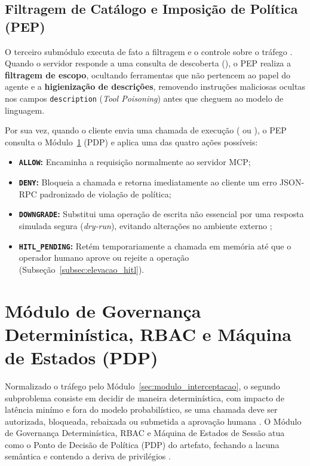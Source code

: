 \subsection{Filtragem de Catálogo e Imposição de Política (PEP)}
\label{subsec:pep_filtragem}

O terceiro submódulo executa de fato a filtragem e o controle sobre o tráfego \cite{singh2026mcpsecure,hasan2026mcp}. Quando o servidor responde a uma consulta de descoberta (), o PEP realiza a \textbf{filtragem de escopo}, ocultando ferramentas que não pertencem ao papel do agente e a \textbf{higienização de descrições}, removendo instruções maliciosas ocultas nos campos \texttt{description} (\textit{Tool Poisoning}) \cite{hasan2026mcp,hou2025mcp} antes que cheguem ao modelo de linguagem.

Por sua vez, quando o cliente envia uma chamada de execução ( ou ), o PEP consulta o Módulo~\ref{sec:modulo_rbac_estados} (PDP) e aplica uma das quatro ações possíveis:
\begin{itemize}
  \item \textbf{\texttt{ALLOW}:} Encaminha a requisição normalmente ao servidor MCP;
  \item \textbf{\texttt{DENY}:} Bloqueia a chamada e retorna imediatamente ao cliente um erro JSON-RPC padronizado de violação de política;
  \item \textbf{\texttt{DOWNGRADE}:} Substitui uma operação de escrita não essencial por uma resposta simulada segura (\textit{dry-run}), evitando alterações no ambiente externo \cite{singh2026mcpsecure};
  \item \textbf{\texttt{HITL\_PENDING}:} Retém temporariamente a chamada em memória até que o operador humano aprove ou rejeite a operação (Subseção~\ref{subsec:elevacao_hitl}).
\end{itemize}

\section{Módulo de Governança Determinística, RBAC e Máquina de Estados (PDP)}
\label{sec:modulo_rbac_estados}

Normalizado o tráfego pelo Módulo~\ref{sec:modulo_interceptacao}, o segundo subproblema consiste em decidir de maneira determinística, com impacto de latência minímo e fora do modelo probabilístico, se uma chamada deve ser autorizada, bloqueada, rebaixada ou submetida a aprovação humana \cite{zhang2025acfix,singh2026mcpsecure}. O Módulo de Governança Determinística, RBAC e Máquina de Estados de Sessão atua como o Ponto de Decisão de Política (PDP) do artefato, fechando a lacuna semântica \cite{buhler2026agentbound} e contendo a deriva de privilégios \cite{singh2026mcpsecure}.

